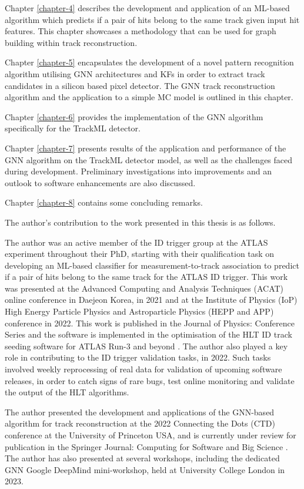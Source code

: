 Chapter \ref{chapter-4} describes the development and application of an ML-based algorithm which predicts if a pair of hits belong to the same track given input hit features. This chapter showcases a methodology that can be used for graph building within track reconstruction.

Chapter \ref{chapter-5} encapsulates the development of a novel pattern recognition algorithm utilising \acs{GNN} architectures and \ac{KF}s in order to extract track candidates in a silicon based pixel detector. The \acs{GNN} track reconstruction algorithm and the application to a simple \ac{MC} model is outlined in this chapter.

Chapter \ref{chapter-6} provides the implementation of the \acs{GNN} algorithm specifically for the TrackML detector.

Chapter \ref{chapter-7} presents results of the application and performance of the \acs{GNN} algorithm on the TrackML detector model, as well as the challenges faced during development. Preliminary investigations into improvements and an outlook to software enhancements are also discussed.

Chapter \ref{chapter-8} contains some concluding remarks.

The author’s contribution to the work presented in this thesis is as follows.

The author was an active member of the \ac{ID} trigger group at the ATLAS experiment throughout their PhD, starting with their qualification task on developing an ML-based classifier for measurement-to-track association to predict if a pair of hits belong to the same track for the ATLAS ID trigger. This work was presented at the Advanced Computing and Analysis Techniques (ACAT) online conference in Daejeon Korea, in 2021 and at the Institute of Physics (IoP) High Energy Particle Physics and Astroparticle Physics (HEPP and APP) conference in 2022. This work is published in the Journal of Physics: Conference Series \cite{Lad_2023} and the software is implemented in the optimisation of the \ac{HLT} ID track seeding software for ATLAS Run-3 and beyond \cite{Grandi:2728111, Long:2813981}. The author also played a key role in contributing to the ID trigger validation tasks, in 2022. Such tasks involved weekly reprocessing of real data for validation of upcoming software releases, in order to catch signs of rare bugs, test online monitoring and validate the output of the \ac{HLT} algorithms.

The author presented the development and applications of the GNN-based algorithm for track reconstruction at the 2022 Connecting the Dots (CTD) conference at the University of Princeton USA, and is currently under review for publication in the Springer Journal: Computing for Software and Big Science \cite{Lad_2023_gnn}. The author has also presented at several workshops, including the dedicated \acs{GNN} Google DeepMind mini-workshop, held at University College London in 2023.

